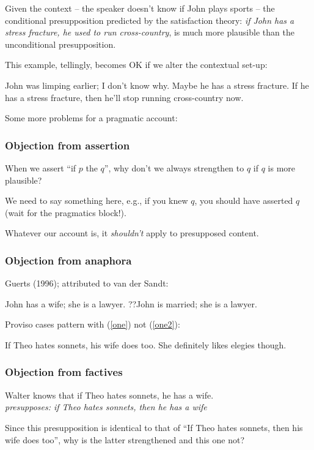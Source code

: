 \documentclass[cronos,landscape,paper=letter]{ling-handout}
\begin{document}
Given the context -- the speaker doesn't know if John plays sports -- the conditional presupposition predicted by the satisfaction theory: \textit{if John has a stress fracture, he used to run cross-country}, is much more plausible than the unconditional presupposition.

This example, tellingly, becomes OK if we alter the contextual set-up:

\ex
John was limping earlier; I don't know why. Maybe he has a stress fracture. If he has a stress fracture, then he'll stop running cross-country now.
\xe

Some more problems for a pragmatic account:

\subsubsection{Objection from assertion}

When we assert \enquote{if \(p\) the \(q\)}, why don't we always strengthen to \(q\) if \(q\) is more plausible?

We need to say something here, e.g., if you knew \(q\), you should have asserted \(q\) (wait for the pragmatics block!).

Whatever our account is, it \textit{shouldn't} apply to presupposed content.

\subsubsection{Objection from anaphora}

Guerts (1996); attributed to van der Sandt:

\pex
\a\label{one}John has a wife; she is a lawyer.
\a\label{one2}??John is married; she is a lawyer.
\xe

Proviso cases pattern with (\ref{one}) not (\ref{one2}):

\ex
If Theo hates sonnets, his wife does too. She definitely likes elegies though.
\xe

\subsubsection{Objection from factives}

\ex
Walter knows that if Theo hates sonnets, he has a wife.\\
\phantom{,}\hfill\textit{presupposes: if Theo hates sonnets, then he has a wife}
\xe

Since this presupposition is identical to that of \enquote{If Theo hates sonnets, then his wife does too}, why is the latter strengthened and this one not?
\end{document}
